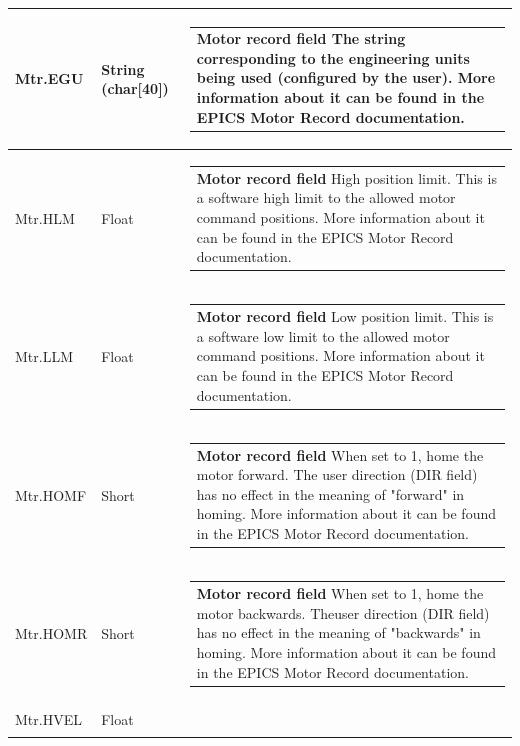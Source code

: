 \documentclass[openany]{article}
\begin{document}
\begin{longtable}{| m{4.5cm} m{2.5cm}  m{8.5cm} |}
        Mtr.EGU & String (char[40]) & \begin{tabular}{@{}m{6cm}@{}}
                \textbf{\color{ForestGreen} Motor record field} The string corresponding to the engineering units being used (configured by the user). More information about it can be found in the EPICS Motor Record documentation.
            \end{tabular} \hypertarget{pv:mtr-hlm}{}\\ \hline
        Mtr.HLM & Float & \begin{tabular}{@{}m{6cm}@{}}
                \textbf{\color{ForestGreen} Motor record field} High position limit. This is a software high limit to the allowed motor command positions. More information about it can be found in the EPICS Motor Record documentation.
            \end{tabular} \hypertarget{pv:mtr-llm}{}\\ \hline
        Mtr.LLM & Float & \begin{tabular}{@{}m{6cm}@{}}
                \textbf{\color{ForestGreen} Motor record field} Low position limit. This is a software low limit to the allowed motor command positions. More information about it can be found in the EPICS Motor Record documentation.
            \end{tabular} \hypertarget{pv:mtr-homf}{}\\ \hline
        Mtr.HOMF & Short & \begin{tabular}{@{}m{6cm}@{}}
                \textbf{\color{ForestGreen} Motor record field} When set to 1, home the motor forward. The user direction (DIR field) has no effect in the meaning of "forward" in homing. More information about it can be found in the EPICS Motor Record documentation.
            \end{tabular} \hypertarget{pv:mtr-homr}{}\\ \hline
        Mtr.HOMR & Short & \begin{tabular}{@{}m{6cm}@{}}
                \textbf{\color{ForestGreen} Motor record field} When set to 1, home the motor backwards. Theuser direction (DIR field) has no effect in the meaning of "backwards" in homing. More information about it can be found in the EPICS Motor Record documentation.
            \end{tabular} \hypertarget{pv:mtr-hvel}{}\\ \hline
        Mtr.HVEL & Float & \begin{tabular}{@{}m{6cm}@{}}

\end{tabular}
\end{longtable}
\end{document}
